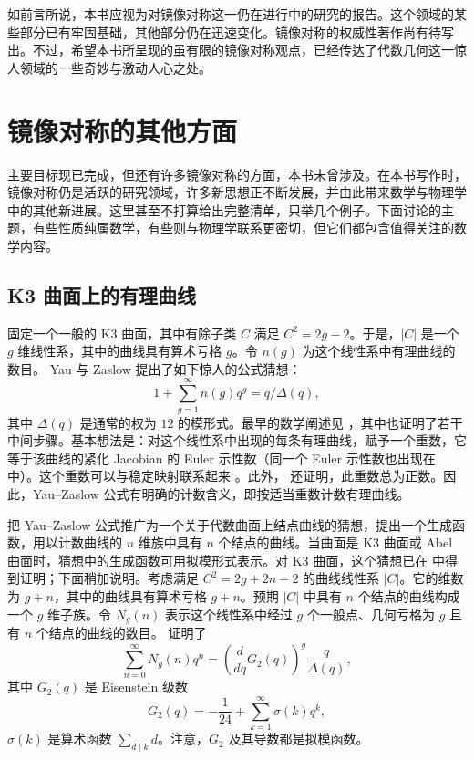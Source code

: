 如前言所说，本书应视为对镜像对称这一仍在进行中的研究的报告。这个领域的某些部分已有牢固基础，其他部分仍在迅速变化。镜像对称的权威性著作尚有待写出。不过，希望本书所呈现的虽有限的镜像对称观点，已经传达了代数几何这一惊人领域的一些奇妙与激动人心之处。

\hypertarget{source:423-batch9}{}
\section{镜像对称的其他方面}\label{sec:other-aspects-mirror-symmetry}
主要目标现已完成，但还有许多镜像对称的方面，本书未曾涉及。在本书写作时，镜像对称仍是活跃的研究领域，许多新思想正不断发展，并由此带来数学与物理学中的其他新进展。这里甚至不打算给出完整清单，只举几个例子。下面讨论的主题，有些性质纯属数学，有些则与物理学联系更密切，但它们都包含值得关注的数学内容。

\subsection{K3 曲面上的有理曲线}\label{subsec:rational-curves-k3}
固定一个一般的 K3 曲面，其中有除子类 $C$ 满足 $C^2=2g-2$。于是，$|C|$ 是一个 $g$ 维线性系，其中的曲线具有算术亏格 $g$。令 $n(g)$ 为这个线性系中有理曲线的数目。
Yau 与 Zaslow  提出了如下惊人的公式猜想：
\[
1+\sum_{g=1}^{\infty}n(g)q^g=q/\Delta(q),
\]
其中 $\Delta(q)$ 是通常的权为 $12$ 的模形式。最早的数学阐述见 ，其中也证明了若干中间步骤。基本想法是：对这个线性系中出现的每条有理曲线，赋予一个重数，它等于该曲线的紧化 Jacobian 的 Euler 示性数（同一个 Euler 示性数也出现在  中）。这个重数可以与稳定映射联系起来 。此外， 还证明，此重数总为正数。因此，Yau--Zaslow 公式有明确的计数含义，即按适当重数计数有理曲线。

 把 Yau--Zaslow 公式推广为一个关于代数曲面上结点曲线的猜想，提出一个生成函数，用以计数曲线的 $n$ 维族中具有 $n$ 个结点的曲线。当曲面是 K3 曲面或 Abel 曲面时，猜想中的生成函数可用拟模形式表示。对 K3 曲面，这个猜想已在  中得到证明；下面稍加说明。考虑满足 $C^2=2g+2n-2$ 的曲线线性系 $|C|$。它的维数为 $g+n$，其中的曲线具有算术亏格 $g+n$。预期 $|C|$ 中具有 $n$ 个结点的曲线构成一个 $g$ 维子族。令 $N_g(n)$ 表示这个线性系中经过 $g$ 个一般点、几何亏格为 $g$ 且有 $n$ 个结点的曲线的数目。 证明了
\[
\sum_{n=0}^{\infty}N_g(n)q^n
=\left(\frac{d}{dq}G_2(q)\right)^g\frac{q}{\Delta(q)},
\]
其中 $G_2(q)$ 是 Eisenstein 级数
\[
G_2(q)=-\frac1{24}+\sum_{k=1}^{\infty}\sigma(k)q^k,
\]
$\sigma(k)$ 是算术函数 $\sum_{d\mid k}d$。注意，$G_2$ 及其导数都是拟模函数。

